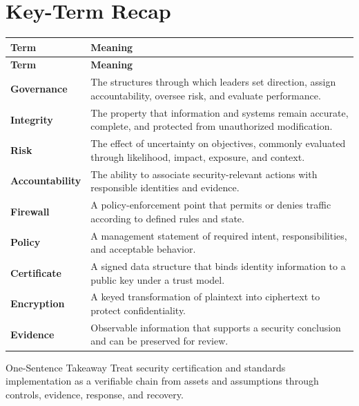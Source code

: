 \documentclass[11pt,letterpaper]{article}
\begin{document}
\section*{Key-Term Recap}
\begin{longtable}{>{\raggedright\arraybackslash}p{}>{\raggedright\arraybackslash}p{}}
\toprule\rowcolor{Navy}\color{white}\textbf{Term} & \color{white}\textbf{Meaning}\\\midrule
\endfirsthead
\toprule\rowcolor{Navy}\color{white}\textbf{Term} & \color{white}\textbf{Meaning}\\\midrule
\endhead
\textbf{Governance} & The structures through which leaders set direction, assign accountability, oversee risk, and evaluate performance. \\\midrule
\textbf{Integrity} & The property that information and systems remain accurate, complete, and protected from unauthorized modification. \\\midrule
\textbf{Risk} & The effect of uncertainty on objectives, commonly evaluated through likelihood, impact, exposure, and context. \\\midrule
\textbf{Accountability} & The ability to associate security-relevant actions with responsible identities and evidence. \\\midrule
\textbf{Firewall} & A policy-enforcement point that permits or denies traffic according to defined rules and state. \\\midrule
\textbf{Policy} & A management statement of required intent, responsibilities, and acceptable behavior. \\\midrule
\textbf{Certificate} & A signed data structure that binds identity information to a public key under a trust model. \\\midrule
\textbf{Encryption} & A keyed transformation of plaintext into ciphertext to protect confidentiality. \\\midrule
\textbf{Evidence} & Observable information that supports a security conclusion and can be preserved for review. \\\midrule
\bottomrule
\end{longtable}
\begin{CornellExamBox}{One-Sentence Takeaway}
Treat security certification and standards implementation as a verifiable chain from assets and assumptions through controls, evidence, response, and recovery.
\end{CornellExamBox}
\end{document}
